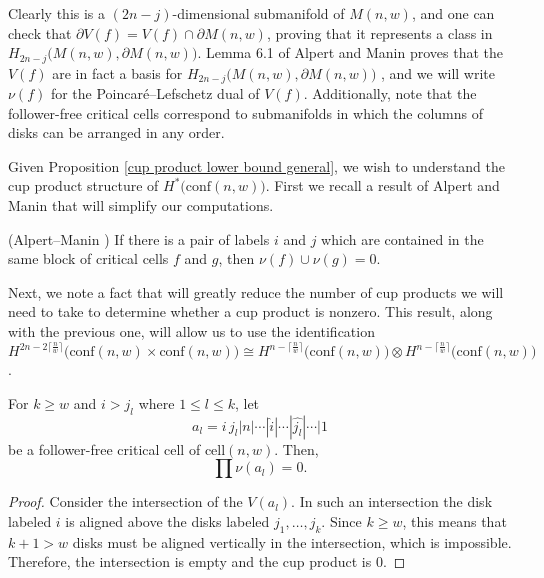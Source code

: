 Clearly this is a $(2n-j)$-dimensional submanifold of $M(n,w)$, and one can check that $\partial V(f)=V(f)\cap \partial M(n,w)$, proving that it represents a class in $H_{2n-j}\big(M(n,w), \partial M(n,w)\big)$.
Lemma 6.1 of Alpert and Manin proves that the $V(f)$ are in fact a basis for $H_{2n-j}\big(M(n,w), \partial M(n,w)\big)$ \cite[Lemma 6.1]{alpert2021configuration1}, and we will write $\nu(f)$ for the Poincar\'{e}--Lefschetz dual of $V(f)$.
Additionally, note that the follower-free critical cells correspond to submanifolds in which the columns of disks can be arranged in any order.

Given Proposition \ref{cup product lower bound general}, we wish to understand the cup product structure of $H^{*}\big(\text{conf}(n,w)\big)$.
First we recall a result of Alpert and Manin that will simplify our computations.

\begin{prop}\label{no repeats in cup product}
(Alpert--Manin \cite[Proposition 6.2]{alpert2021configuration1}) If there is a pair of labels $i$ and $j$ which are contained in the same block of critical cells $f$ and $g$, then $\nu(f)\cup \nu(g)=0$.
\end{prop}

Next, we note a fact that will greatly reduce the number of cup products we will need to take to determine whether a cup product is nonzero.
This result, along with the previous one, will allow us to use the identification $H^{2n-2\big\lceil\frac{n}{w}\big\rceil}\big(\text{conf}(n,w)\times\text{conf}(n,w)\big)\cong H^{n-\big\lceil\frac{n}{w}\big\rceil}\big(\text{conf}(n,w)\big)\otimes H^{n-\big\lceil\frac{n}{w}\big\rceil}\big(\text{conf}(n,w)\big)$.

\begin{prop}\label{product of more than w-1 terms with same first is trivial}
For $k\ge w$ and $i>j_{l}$ where $1\le l\le k$, let
\[
a_{l}=i\, j_{l}|n|\cdots|\widehat{i}|\cdots|\widehat{j_{l}}|\cdots|1
\]
be a follower-free critical cell of $\text{cell}(n,w)$.
Then,
\[
\prod\nu(a_{l})=0.
\]
\end{prop}

\begin{proof}
Consider the intersection of the $V(a_{l})$. 
In such an intersection the disk labeled $i$ is aligned above the disks labeled $j_{1},\dots, j_{k}$.
Since $k\ge w$, this means that $k+1>w$ disks must be aligned vertically in the intersection, which is impossible. 
Therefore, the intersection is empty and the cup product is $0$.
\end{proof}

